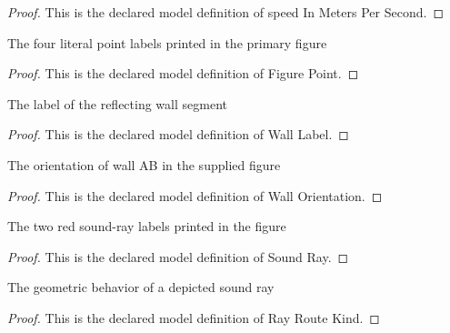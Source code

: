 \begin{proof}
  This is the declared model definition of speed In Meters Per Second.
\end{proof}
\begin{definition}
  \label{def:physics:phyx-mini-0330:phyxminiproblems-problemphyxmini0330-figurepoint}
  The four literal point labels printed in the primary figure
\end{definition}
\begin{proof}
  This is the declared model definition of Figure Point.
\end{proof}
\begin{definition}
  \label{def:physics:phyx-mini-0330:phyxminiproblems-problemphyxmini0330-walllabel}
  The label of the reflecting wall segment
\end{definition}
\begin{proof}
  This is the declared model definition of Wall Label.
\end{proof}
\begin{definition}
  \label{def:physics:phyx-mini-0330:phyxminiproblems-problemphyxmini0330-wallorientation}
  The orientation of wall AB in the supplied figure
\end{definition}
\begin{proof}
  This is the declared model definition of Wall Orientation.
\end{proof}
\begin{definition}
  \label{def:physics:phyx-mini-0330:phyxminiproblems-problemphyxmini0330-soundray}
  The two red sound-ray labels printed in the figure
\end{definition}
\begin{proof}
  This is the declared model definition of Sound Ray.
\end{proof}
\begin{definition}
  \label{def:physics:phyx-mini-0330:phyxminiproblems-problemphyxmini0330-rayroutekind}
  The geometric behavior of a depicted sound ray
\end{definition}
\begin{proof}
  This is the declared model definition of Ray Route Kind.
\end{proof}
